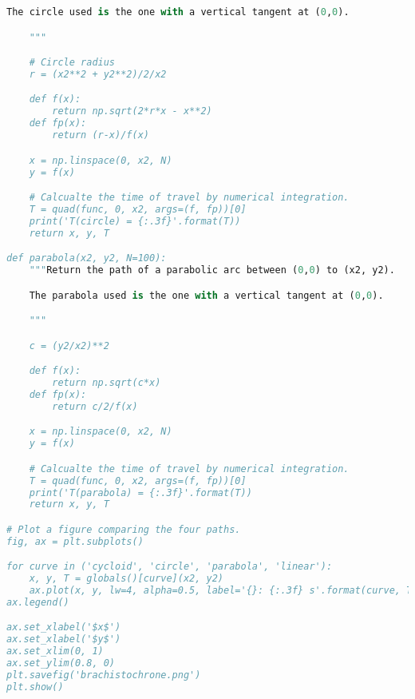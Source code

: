 \begin{lstlisting}[language=Python, frame=lines, basicstyle=\footnotesize, caption={Tempo de Viagem na braquistócrona e em outras curvas}, label={lst:var1}]
    The circle used is the one with a vertical tangent at (0,0).

    """

    # Circle radius
    r = (x2**2 + y2**2)/2/x2

    def f(x):
        return np.sqrt(2*r*x - x**2)
    def fp(x):
        return (r-x)/f(x)

    x = np.linspace(0, x2, N)
    y = f(x)

    # Calcualte the time of travel by numerical integration.
    T = quad(func, 0, x2, args=(f, fp))[0]
    print('T(circle) = {:.3f}'.format(T))
    return x, y, T

def parabola(x2, y2, N=100):
    """Return the path of a parabolic arc between (0,0) to (x2, y2).

    The parabola used is the one with a vertical tangent at (0,0).

    """

    c = (y2/x2)**2

    def f(x):
        return np.sqrt(c*x)
    def fp(x):
        return c/2/f(x)

    x = np.linspace(0, x2, N)
    y = f(x)

    # Calcualte the time of travel by numerical integration.
    T = quad(func, 0, x2, args=(f, fp))[0]
    print('T(parabola) = {:.3f}'.format(T))
    return x, y, T

# Plot a figure comparing the four paths.
fig, ax = plt.subplots()

for curve in ('cycloid', 'circle', 'parabola', 'linear'):
    x, y, T = globals()[curve](x2, y2)
    ax.plot(x, y, lw=4, alpha=0.5, label='{}: {:.3f} s'.format(curve, T))
ax.legend()

ax.set_xlabel('$x$')
ax.set_xlabel('$y$')
ax.set_xlim(0, 1)
ax.set_ylim(0.8, 0)
plt.savefig('brachistochrone.png')
plt.show()
\end{lstlisting}